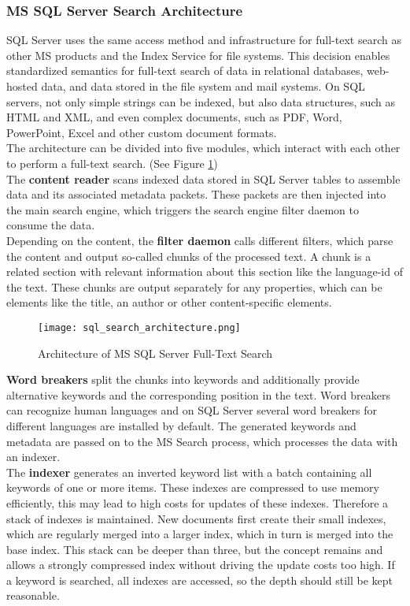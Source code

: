\subsubsection{MS SQL Server Search Architecture}
\ac{SQL} Server uses the same access method and infrastructure for full-text search as other \ac{MS} products and the Index Service for file systems. This decision enables standardized semantics for full-text search of data in relational databases, web-hosted data, and data stored in the file system and mail systems. On \ac{SQL} servers, not only simple strings can be indexed, but also data structures, such as \ac{HTML} and \ac{XML}, and even complex documents, such as \ac{PDF}, Word, PowerPoint, Excel and other custom document formats. \parencite[cf.][p. 7]{hamilton_microsoft_2001}\\
The architecture can be divided into five modules, which interact with each other to perform a full-text search. (See Figure \ref{fig:sql_search_architecture})\\
The \textbf{content reader} scans indexed data stored in \ac{SQL} Server tables to assemble data and its associated metadata packets. These packets are then injected into the main search engine, which triggers the search engine filter daemon to consume the data.\\
Depending on the content, the \textbf{filter daemon} calls different filters, which parse the content and output so-called chunks of the processed text. A chunk is a related section with relevant information about this section like the language-id of the text. These chunks are output separately for any properties, which can be elements like the title, an author or other content-specific elements.
\begin{figure}[H]
    \caption{Architecture of MS SQL Server Full-Text Search}
    \label{fig:sql_search_architecture}
    \texttt{[image: sql\_search\_architecture.png]}
    \\
    \cite[Source:][p. 8]{hamilton_microsoft_2001}
\end{figure}
\textbf{Word breakers} split the chunks into keywords and additionally provide alternative keywords and the corresponding position in the text. Word breakers can recognize human languages and on \ac{SQL} Server several word breakers for different languages are installed by default. The generated keywords and metadata are passed on to the \ac{MS} Search process, which processes the data with an indexer.\\
The \textbf{indexer} generates an inverted keyword list with a batch containing all keywords of one or more items. These indexes are compressed to use memory efficiently, this may lead to high costs for updates of these indexes. Therefore a stack of indexes is maintained. New documents first create their small indexes, which are regularly merged into a larger index, which in turn is merged into the base index. This stack can be deeper than three, but the concept remains and allows a strongly compressed index without driving the update costs too high. If a keyword is searched, all indexes are accessed, so the depth should still be kept reasonable.\\
